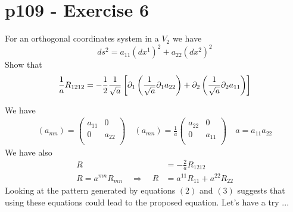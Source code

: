 \section{p109 - Exercise 6}
\begin{tcolorbox}
For an orthogonal coordinates system in a $V_2$ we have $$ ds^2=a_{11}\left( dx^1\right)^2+a_{22}\left( dx^2\right)^2$$
Show that 
$$\frac{1}{a}R_{1212}= -\frac{1}{2}\frac{1}{\sqrt{a}}\left[\partial_1\left(\frac{1}{\sqrt{a}}\partial_1 a_{22}\right)+\partial_2\left(\frac{1}{\sqrt{a}}\partial_2 a_{11}\right)\right]$$
\end{tcolorbox}
We have 
\begin{align}
\left(a_{mn}\right)= \begin{pmatrix}
 a_{11}& 0 \\
 0& a_{22} \\
\end{pmatrix}\quad \left(a_{mn}\right)= \frac{1}{a}\begin{pmatrix}
 a_{22}& 0 \\
 0& a_{11} \\
\end{pmatrix}\quad
 a= a_{11}a_{22}
\end{align}
We have also \\
\begin{align}
R &= -\frac{2}{a}R_{1212}\\
R =  a^{mn}R_{mn}\quad\Rightarrow\quad R &= a^{11}R_{11}+ a^{22}R_{22}
\end{align}
Looking at the pattern generated by equations $(2)$ and $(3)$ suggests that using these equations could lead to the proposed equation. Let's have a try ...
